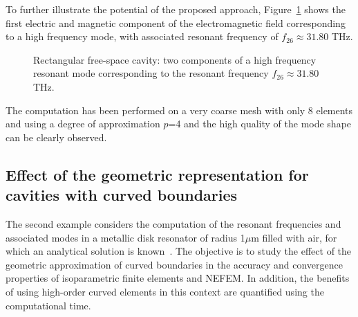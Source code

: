 To further illustrate the potential of the proposed approach, Figure~\ref{fig:rectangle2DfreeSpace_modesHF} shows the first electric and magnetic component of the electromagnetic field corresponding to a high frequency mode, with associated resonant frequency of $f_{26} \approx 31.80$ THz. 
\begin{figure}[!ht]
	\centering
	\hspace{1cm}
	\caption{Rectangular free-space cavity: two components of a high frequency resonant mode corresponding to the resonant frequency $f_{26} \approx 31.80$ THz.}
	\label{fig:rectangle2DfreeSpace_modesHF}
\end{figure}
The computation has been performed on a very coarse mesh with only 8 elements and using a degree of approximation $p$=4 and the high quality of the mode shape can be clearly observed.

\clearpage
\subsection{Effect of the geometric representation for cavities with curved boundaries}
The second example considers the computation of the resonant frequencies and associated modes in a metallic disk resonator of radius 1$\mu$m filled with air, for which an analytical solution is known~\cite{BalanisBook}. The objective is to study the effect of the geometric approximation of curved boundaries in the accuracy and convergence properties of isoparametric finite elements and NEFEM. In addition, the benefits of using high-order curved elements in this context are quantified using the computational time. 

